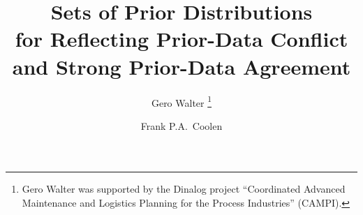\documentclass[runningheads,a4paper]{llncs}
\begin{document}
\mainmatter  %

\title{Sets of Prior Distributions\\ for Reflecting Prior-Data Conflict\\ and Strong Prior-Data Agreement}


%
%
\author{Gero Walter%
\thanks{Gero Walter was supported by the Dinalog project
``Coordinated Advanced Maintenance and Logistics Planning for the Process Industries'' (CAMPI).}%
\and Frank P.A.\ Coolen}
%


%
%

\maketitle
\end{document}
